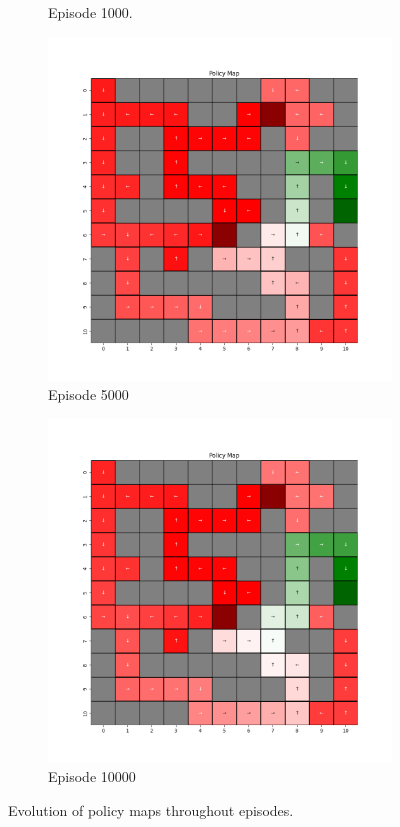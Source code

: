 \documentclass{assignment}
\begin{document}
\begin{figure}[H]
\begin{subfigure}{0.3\textwidth}
    \caption{Episode 1000.}
    \end{subfigure}\hfill
    \begin{subfigure}{0.3\textwidth}
        \includegraphics[width=\textwidth]{figures/policy_q/epsilon_sweep/policy_alpha_0.1_gamma_0.95_epsilon_0.0_iteration_5000.png}
    \caption{Episode 5000}
    \end{subfigure}\hfill
    \begin{subfigure}{0.3\textwidth}
        \includegraphics[width=\textwidth]{figures/policy_q/epsilon_sweep/policy_alpha_0.1_gamma_0.95_epsilon_0.0_iteration_10000.png}
    \caption{Episode 10000}
    \end{subfigure}
    \caption{Evolution of policy maps throughout episodes.}
    \label{fig:epsilon_0.0_q_learning_policy}
\end{figure}
\end{document}
